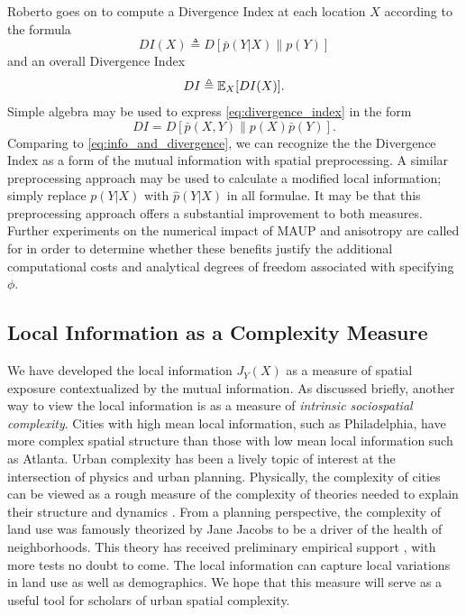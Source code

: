 \documentclass[english]{scrartcl}
\begin{document}
		Roberto goes on to compute a Divergence Index at each location $X$ according to the formula 
		\begin{equation*}
			DI(X) \triangleq D[\bar{p}(Y|X)\|p(Y)] 
		\end{equation*}
		and an overall Divergence Index 
		\begin{equation}
			DI \triangleq \mathbb{E}_X[DI(X)]. \label{eq:divergence_index} 
		\end{equation}
		Simple algebra may be used to express \eqref{eq:divergence_index} in the form 
		\begin{equation*}
			DI = D[\bar{p}(X,Y) \| p(X)\bar{p}(Y)]. 
		\end{equation*}
		Comparing to \eqref{eq:info_and_divergence}, we can recognize the the Divergence Index as a form of the mutual information with spatial preprocessing. A similar preprocessing approach may be used to calculate a modified local information; simply replace $p(Y|X)$ with $\hat{p}(Y|X)$ in all formulae. It may be that this preprocessing approach offers a substantial improvement to both measures. Further experiments on the numerical impact of MAUP and anisotropy are called for in order to determine whether these benefits justify the additional computational costs and analytical degrees of freedom associated with specifying $\phi$.  


	\subsection*{Local Information as a Complexity Measure}

		We have developed the local information $J_Y(X)$ as a measure of spatial exposure contextualized by the mutual information. As discussed briefly, another way to view the local information is as a measure of \emph{intrinsic sociospatial complexity}. Cities with high mean local information, such as Philadelphia, have more complex spatial structure than those with low mean local information such as Atlanta. Urban complexity has been a lively topic of interest at the intersection of physics and urban planning. Physically, the complexity of cities can be viewed as a rough measure of the complexity of theories needed to explain their structure and dynamics \cite{Bettencourt2015}. From a planning perspective, the complexity of land use was famously theorized by Jane Jacobs \cite{Jacobs1992} to be a driver of the health of neighborhoods. This theory has received preliminary empirical support \cite{DeNadai2016a}, with more tests no doubt to come. The local information can capture local variations in land use as well as demographics. We hope that this measure will serve as a useful tool for scholars of urban spatial complexity.  
\end{document}
